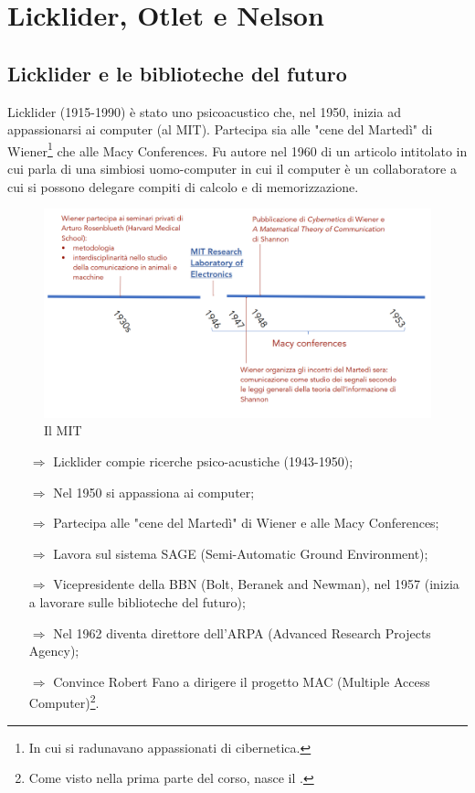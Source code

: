 \chapter{Licklider, Otlet e Nelson}

\section{Licklider e le biblioteche del futuro}

Licklider (1915-1990) è stato uno psicoacustico che, nel 1950, inizia ad appassionarsi
ai computer (al MIT). Partecipa sia alle "cene del Martedì" di Wiener\footnote{In cui si radunavano appassionati di cibernetica.} che 
alle Macy Conferences. Fu autore nel 1960 di un articolo intitolato  in cui
parla di una simbiosi uomo-computer in cui il computer è un collaboratore a cui si possono delegare
compiti di calcolo e di memorizzazione. 

\begin{figure}[h]
    \centering
    \includegraphics[scale=0.35]{images/MIT.png}
    \caption{Il MIT}
\end{figure}

\begin{itemize}
    \item [$\Rightarrow$] Licklider compie ricerche psico-acustiche (1943-1950);
    \item [$\Rightarrow$] Nel 1950 si appassiona ai computer;
    \item [$\Rightarrow$] Partecipa alle "cene del Martedì" di Wiener e alle Macy Conferences;
    \item [$\Rightarrow$] Lavora sul sistema SAGE (Semi-Automatic Ground Environment);
    \item [$\Rightarrow$] Vicepresidente della BBN (Bolt, Beranek and Newman), nel 1957 (inizia a lavorare sulle biblioteche del futuro);
    \item [$\Rightarrow$] Nel 1962 diventa direttore dell'ARPA (Advanced Research Projects Agency);
    \item [$\Rightarrow$] Convince Robert Fano a dirigere il progetto MAC (Multiple Access Computer)\footnote{Come visto nella prima parte del corso, nasce il .}.
\end{itemize}

